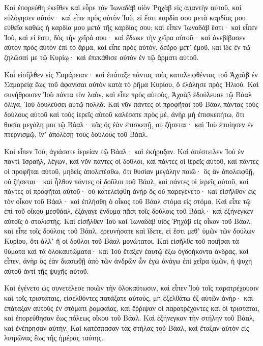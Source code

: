 {\par }{\PP {}Καὶ ἐπορεύθη ἐκεῖθεν καὶ εὗρε τὸν Ἰωναδὰβ υἱὸν Ῥηχὰβ εἰς ἀπαντὴν αὐτοῦ, καὶ εὐλόγησεν αὐτόν· καὶ εἶπε πρὸς αὐτὸν Ἰοὺ, εἰ ἔστι καρδία σου μετὰ καρδίας μου εὐθεῖα καθὼς ἡ καρδία μου μετὰ τῆς καρδίας σου; καὶ εἶπεν Ἰωναδάβ ἔστι· καὶ εἶπεν Ἰοὺ, καὶ εἰ ἔστι, δὸς τὴν χεῖρά σου· καὶ ἔδωκε τὴν χεῖρα αὐτοῦ· καὶ ἀνεβίβασεν αὐτὸν πρὸς αὐτὸν ἐπὶ τὸ ἅρμα,
καὶ εἶπε πρὸς αὐτὸν, δεῦρο μετʼ ἐμοῦ, καὶ ἴδε ἐν τῷ ζηλῶσαί με τῷ Κυρίῳ· καὶ ἐπεκάθισε αὐτὸν ἐν τῷ ἅρματι αὐτοῦ.
\par }{\PP {}Καὶ εἰσῆλθεν εἰς Σαμάρειαν· καὶ ἐπάταξε πάντας τοὺς καταλειφθέντας τοῦ Ἀχαὰβ ἐν Σαμαρείᾳ ἕως τοῦ ἀφανίσαι αὐτὸν κατὰ τὸ ῥῆμα Κυρίου, ὃ ἐλάλησε πρὸς Ἠλιού.
Καὶ συνήθροισεν Ἰοὺ πάντα τὸν λαὸν, καὶ εἶπε πρὸς αὐτοὺς, Ἀχαὰβ ἐδούλευσε τῷ Βάαλ ὀλίγα, Ἰοὺ δουλεύσει αὐτῷ πολλά.
Καὶ νῦν πάντες οἱ προφῆται τοῦ Βάαλ πάντας τοὺς δούλους αὐτοῦ καὶ τοὺς ἱερεῖς αὐτοῦ καλέσατε πρὸς μὲ, ἀνὴρ μὴ ἐπισκεπήτω, ὅτι θυσία μεγάλη μοι τῷ Βάαλ· πᾶς ὃς ἐὰν ἐπισκεπῇ, οὐ ζήσεται· καὶ Ἰοὺ ἐποίησεν ἐν πτερνισμῷ, ἵνʼ ἀπολέσῃ τοὺς δούλους τοῦ Βάαλ.
\par }{\PP {}Καὶ εἶπεν Ἰοὺ, ἁγιάσατε ἱερείαν τῷ Βάαλ· καὶ ἐκήρυξαν.
Καὶ ἀπέστειλεν Ἰοὺ ἐν παντὶ Ἰσραὴλ, λέγων, καὶ νῦν πάντες οἱ δοῦλοι, καὶ πάντες οἱ ἱερεῖς αὐτοῦ, καὶ πάντες οἱ προφῆται αὐτοῦ, μηδεὶς ἀπολιπέσθω, ὅτι θυσίαν μεγάλην ποιῶ· ὃς ἂν ἀπολειφθῇ, οὐ ζήσεται· καὶ ἦλθον πάντες οἱ δοῦλοι τοῦ Βάαλ, καὶ πάντες οἱ ἱερεῖς αὐτοῦ, καὶ πάντες οἱ προφῆται αὐτοῦ· οὐ κατελείφθη ἀνὴρ ὃς οὐ παρεγένετο· καὶ εἰσῆλθον εἰς τὸν οἶκον τοῦ Βάαλ· καὶ ἐπλήσθη ὁ οἶκος τοῦ Βάαλ στόμα εἰς στόμα.
Καὶ εἶπε τῷ ἐπὶ τοῦ οἴκου μεσθάαλ, ἐξάγαγε ἔνδυμα πᾶσι τοῖς δούλοις τοῦ Βάαλ· καὶ ἐξήνεγκεν αὐτοῖς ὁ στολιστής.
Καὶ εἰσῆλθεν Ἰοὺ καὶ Ἰωναδὰβ υἱὸς Ῥηχὰβ εἰς οἶκον τοῦ Βάαλ, καὶ εἶπε τοῖς δούλοις τοῦ Βάαλ, ἐρευνήσατε καὶ ἴδετε, εἰ ἔστι μεθʼ ὑμῶν τῶν δούλων Κυρίου, ὅτι ἀλλʼ ἢ οἱ δοῦλοι τοῦ Βάαλ μονώτατοι.
Καὶ εἰσῆλθε τοῦ ποιῆσαι τὰ θύματα καὶ τὰ ὁλοκαυτώματα· καὶ Ἰοὺ ἔταξεν ἑαυτῷ ἔξω ὀγδοήκοντα ἄνδρας, καὶ εἶπεν, ἀνὴρ ὃς ἐὰν διασωθῇ ἀπὸ τῶν ἀνδρῶν ὧν ἐγὼ ἀνάγω ἐπὶ χεῖρα ὑμῶν, ἡ ψυχὴ αὐτοῦ ἀντὶ τῆς ψυχῆς αὐτοῦ.
\par }{\PP {}Καὶ ἐγένετο ὡς συνετέλεσε ποιῶν τὴν ὁλοκαύτωσιν, καὶ εἶπεν Ἰοὺ τοῖς παρατρέχουσιν καὶ τοῖς τριστάταις, εἰσελθόντες πατάξατε αὐτοὺς, μὴ ἐξελθάτω ἐξ αὐτῶν ἀνήρ· καὶ ἐπάταξαν αὐτοὺς ἐν στόματι ῥομφαίας, καὶ ἔῤῥιψαν οἱ παρατρέχοντες καὶ οἱ τριστάται, καὶ ἐπορεύθησαν ἕως πόλεως οἴκου τοῦ Βάαλ.
Καὶ ἐξήνεγκαν τὴν στήλην τοῦ Βάαλ, καὶ ἐνέπρησαν αὐτήν.
Καὶ κατέσπασαν τὰς στήλας τοῦ Βάαλ, καὶ ἔταξαν αὐτὸν εἰς λυτρῶνας ἕως τῆς ἡμέρας ταύτης.
}
